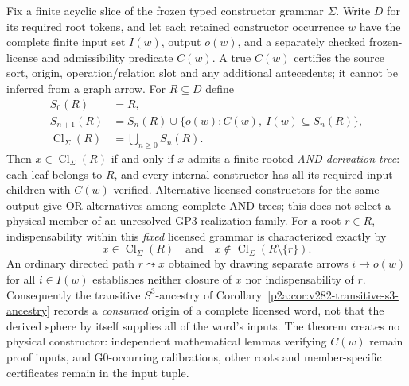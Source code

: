 \documentclass[12pt,a4paper]{article}
\begin{document}
\begin{theorem}
\label{p2a:thm:v283-conjunctive-constructor-closure}
Fix a finite acyclic slice of the frozen typed constructor grammar
$\Sigma$.  Write $D$ for its required root tokens, and let each
retained constructor occurrence $w$ have the complete finite input set
$I(w)$, output $o(w)$, and a separately checked frozen-license and
admissibility predicate $C(w)$.  A true $C(w)$ certifies the source
sort, origin, operation/relation slot and any additional antecedents; it
cannot be inferred from a graph arrow.  For $R\subseteq D$ define
\[
 \begin{aligned}
  S_0(R)&=R,\\
  S_{n+1}(R)&=S_n(R)\cup\{o(w): C(w),\ I(w)\subseteq S_n(R)\},\\
  \operatorname{Cl}_\Sigma(R)&=\bigcup_{n\ge0}S_n(R).
 \end{aligned}
\]
Then $x\in\operatorname{Cl}_\Sigma(R)$ if and only if $x$ admits a
finite rooted \emph{AND-derivation tree}: each leaf belongs to $R$,
and every internal constructor has all its required input children
with $C(w)$ verified.  Alternative licensed constructors for the same
output give OR-alternatives among complete AND-trees; this does not
select a physical member of an unresolved GP3 realization family.
For a root $r\in R$, indispensability within this \emph{fixed}
licensed grammar is characterized exactly by
\[
 x\in\operatorname{Cl}_\Sigma(R)
 \quad\text{and}\quad
 x\notin\operatorname{Cl}_\Sigma(R\setminus\{r\}).
\]
An ordinary directed path $r\leadsto x$ obtained by drawing separate
arrows $i\to o(w)$ for all $i\in I(w)$ establishes neither closure of
$x$ nor indispensability of $r$.  Consequently the transitive
$S^3$-ancestry of
Corollary~\ref{p2a:cor:v282-transitive-s3-ancestry} records a
\emph{consumed} origin of a complete licensed word, not that the derived
sphere by itself supplies all of the word's inputs.  The theorem
creates no physical constructor: independent mathematical lemmas
verifying $C(w)$ remain proof inputs, and G0-occurring calibrations,
other roots and member-specific certificates remain in the input tuple.
\end{theorem}
\end{document}
